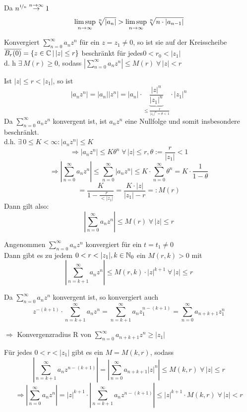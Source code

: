 \documentclass[../ana1u.tex]{subfiles}
\begin{document}
\begin{bew}
	Da \(n^{\nicefrac{1}{n}} \overset{n \rightarrow \infty}{\rightarrow} 1 \)
	\[\limsup\limits_{n\rightarrow\infty}\sqrt[n]{|a_n|} > \limsup\limits_{n\rightarrow\infty}\sqrt[n]{n \cdot |a_{n-1}|} \]
\end{bew}
\begin{kor}
	Konvergiert \(\sum_{n=0}^{\infty} a_n z^n \) für ein \(z = z_1 \neq 0 \), 
	so ist sie auf der Kreisscheibe \(\overline{B_r(0)} = \{z \in \mathbb{C} \, | \, |z| \leq r\} \) 
	beschränkt für jedes\(0 < r_0 < |z_1| \) \\
	d. h \(\exists \, M(r) \geq 0 \), sodass \(|\sum_{n=0}^{\infty} a_n z^n| 
	\leq M(r) \; \forall \, |z| < r \)
\end{kor}
\begin{bew}
	Ist \(|z| \leq r < |z_1| \), so ist
	\[|a_n z^n| = |a_n||z^n| = |a_n| \cdot 
	\underbrace{\frac{|z|^n}{|z_1|^n}}_{\leq \frac{r}{|z_1|^n 
	= \theta < 1}} \cdot |z_1|^n \]
	Da \(\sum_{n=0}^{\infty} a_n z^n \) konvergent ist, 
	ist \(a_n z^n\) eine Nullfolge und somit insbesondere beschränkt. \\
	d.h. \(\exists \, 0 \leq K < \infty: |a_n z^n| \leq K \)
	\[\Rightarrow |a_n z^n| \leq K\theta^n \; \forall \, |z| \leq r, 
	\theta := \frac{r}{|z_1|} < 1 \]
	\[\Rightarrow \left|\sum_{n=0}^{\infty} a_n z^n\right| 
	\leq \sum_{n=0}^{\infty} |a_n z^n| \leq K \cdot \sum_{n=0}^{\infty} \theta^n 
	= K \cdot \frac{1}{1 - \theta} \]
	\[= \frac{K}{1 - \frac{r}{<|z_1|}} = \frac{K \cdot |z|}{|z_1| - r} =: M(r) \]
	Dann gilt also:
	\[|\sum_{n=0}^{\infty} a_n z^n| \leq M(r) \; \forall \, |z| \leq r \]
\end{bew}
\begin{kor}
	Angenommen \(\sum_{n=0}^{\infty} a_n z^n \) konvergiert für ein \(t = t_1 \neq 0\) \\
	Dann gibt es zu jedem \(0 < r < |z_1|, k \in \mathbb{N}_0 \) ein \(M(r, k) > 0 \) mit
	\[\left|\sum_{n=k+1}^{\infty} a_n z^n\right| 
	\leq M(r, k) \cdot |z|^{k+1} \; \forall \, |z| \leq r \]
\end{kor}
\begin{bew}
	Da \(\sum_{n=0}^{\infty} a_n z^n \) konvergent ist, so konvergiert auch
	\[z^{-(k+1)} \cdot \sum_{n=k+1}^{\infty} a_n z^n 
	= \sum_{n=k+1}^{\infty} a_n z_1^{n-(k+1)} = \sum_{n=0}^{\infty} a_{n+k+1} z_1^n \]
\end{bew}
\begin{lem}
	\(\Rightarrow\) Konvergenzradius R von \(\sum_{n=0}^{\infty} a_{n+k+1} z^n \geq |z_1| \)
\end{lem}
\begin{lem}
	Für jedes \(0 < r < |z_1| \) gibt es ein \(M = M(k,r) \), sodass
	\[\left|\sum_{n=k+1}^{\infty} a_{n} z^{n-(k+1)}\right| 
	= \left|\sum_{n=0}^{\infty} a_{n+k+1} |z|^n\right| \leq M(k,r) \; \forall \, |z| \leq r \]
	\[\Rightarrow \left|\sum_{n=0}^{\infty} a_n z^n \right| 
	= |z|^{k+1} \cdot \left|\sum_{n=k+1}^{\infty} a_{n} z^{n-(k+1)}\right| 
	\leq |z|^{k+1} \cdot M(k,r) \; \forall \, |z| < r \]
\end{lem}
\end{document}
